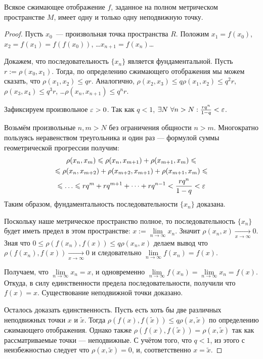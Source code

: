 \documentclass[a4paper, 12pt]{article}
\begin{document}
\begin{Theorem}
	Всякое сжимающее отображение $f$, заданное на полном метрическом пространстве $M$, имеет одну и только одну неподвижную точку.
\end{Theorem}
\begin{proof}

Пусть  $x_0 $ — произвольная точка пространства  $R $. Положим $x_1 = f(x_0) $, $x_2 = f(x_1) = f(f(x_0))$, \dots $x_{n+1} = f(x_{n})$\dots

Докажем, что последовательность  $\{ x_n \} $ является фундаментальной.
Пусть $r := \rho(x_0, x_1)$.  Тогда, по определению сжимающего отображения мы можем сказать, что  $\rho(x_1, x_2) \leq qr$. Аналогично, $\rho(x_2, x_3) \leq q \rho(x_1, x_2) \leq q^2r $, $\rho(x_3, x_4) \leq q^3r $, \dots  $\rho(x_{n}, x_{n+1}) \leq q^nr$.

Зафиксируем произвольное $\varepsilon>0$. 
Так как  $q < 1 $, $\exists N\ \forall n>N: \frac{rq^n}{1-q} < \varepsilon$.

Возьмём произвольные $n, m >N$ без ограничения общности $n>m$.
Многократно пользуясь неравенством треугольника и один раз --- формулой суммы геометрической прогрессии получим:
\begin{multline}\rho(x_n, x_m) \leq \rho(x_n, x_{m+1})+\rho(x_{m+1}, x_m)\leq\\ \leq \rho(x_n, x_{m+2})+ \rho(x_{m+2}, x_{m+1})+\rho(x_{m+1}, x_m) \leq\\\leq \dots\leq rq^{m} + rq^{m+1}+\dots+rq^{n-1} < \frac{rq^n}{1-q} < \eps \end{multline}	
Таким образом, фундаментальность последовательности  $\{ x_n \} $ доказана. 


Поскольку наше метрическое пространство полное, то последовательность $\{ x_n \}$ будет иметь предел в этом пространстве: $x:= \lim\limits_{n \to \infty}x_n$.
Значит $\rho(x_{n}, x) \xrightarrow[x \to\infty]{} 0$. Зная что $0\leq\rho(f(x_{n}), f(x))\leq q \rho(x_{n}, x)$ делаем вывод что $\rho(f(x_{n}), f(x)) \xrightarrow[x \to\infty]{} 0$ и следовательно $\lim\limits_{n \to \infty}f(x_n) = f(x)$.

Получаем, что  $\lim\limits_{n \to \infty}x_n = x$, и одновременно $\lim\limits_{n \to \infty}f(x_n) = \lim\limits_{n \to \infty}x_n= f(x)$. Откуда, в силу единственности предела последовательности, получили что $f(x) = x$.
Существование неподвижной точки доказано.


Осталось доказать единственность. 
Пусть есть хоть бы две различных неподвижных точки $x$ и $\tilde{x}$.
Тогда $\rho(f(x), f(\tilde{x})) \leq q\rho(x, \tilde{x})$ по определению сжимающего отображения. Однако также $\rho(f(x), f(\tilde{x})) = \rho(x, \tilde{x})$ так как рассматриваемые точки --- неподвижные. С учётом того, что $q<1$, из этого с неизбежностью следует что $\rho(x, \tilde{x}) = 0$, и, соответственно $x = \tilde{x}$.

\end{proof}
\end{document}
